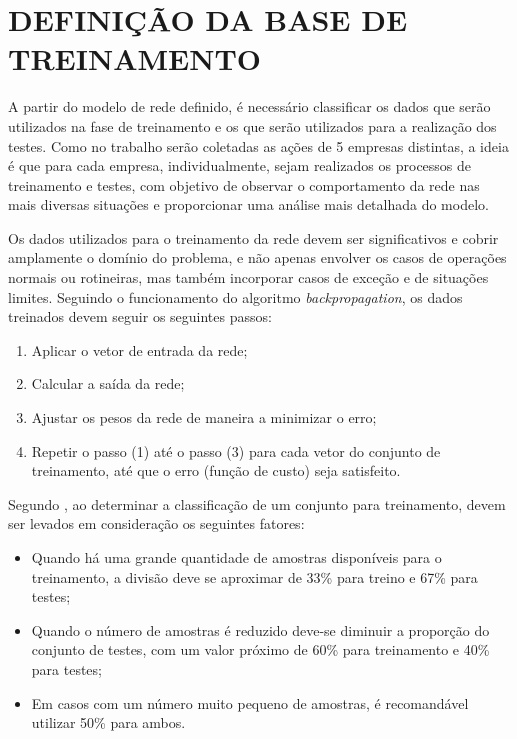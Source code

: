 \section{DEFINIÇÃO DA BASE DE TREINAMENTO}
A partir do modelo de rede definido, é necessário classificar os dados que serão utilizados na fase de treinamento e os que serão utilizados para a realização dos testes. Como no trabalho serão coletadas as ações de 5 empresas distintas, a ideia é que para cada empresa, individualmente, sejam realizados os processos de treinamento e testes, com objetivo de observar o comportamento da rede nas mais diversas situações e proporcionar uma análise mais detalhada do modelo.

Os dados utilizados para o treinamento da rede devem ser significativos e cobrir amplamente o domínio do problema, e não apenas envolver os casos de operações normais ou rotineiras, mas também incorporar casos de exceção e de situações limites. Seguindo o funcionamento do algoritmo \textit{backpropagation}, os dados treinados devem seguir os seguintes passos:

\begin{enumerate}
\item Aplicar o vetor de entrada da rede;
\item Calcular a saída da rede;
\item Ajustar os pesos da rede de maneira a minimizar o erro;
\item Repetir o passo (1) até o passo (3) para cada vetor do conjunto de treinamento, até que o erro (função de custo) seja satisfeito. 
\end{enumerate}

Segundo , ao determinar a classificação de um conjunto para treinamento, devem ser levados em consideração os seguintes fatores:

\begin{itemize}
\item Quando há uma grande quantidade de amostras disponíveis para o treinamento, a divisão deve se aproximar de 33\% para treino e 67\% para testes;
\item Quando o número de amostras é reduzido deve-se diminuir a proporção do conjunto de testes, com um valor próximo de 60\% para treinamento e 40\% para testes;
\item Em casos com um número muito pequeno de amostras, é recomandável utilizar 50\% para ambos.
\end{itemize}

